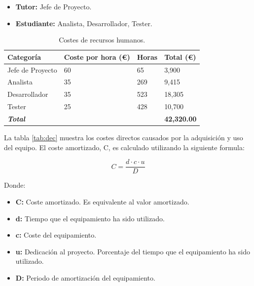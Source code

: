 \begin{itemize}

\item \textbf{Tutor:} Jefe de Proyecto.

\item \textbf{Estudiante:} Analista, Desarrollador, Tester.

\end{itemize} 

\begin{center}
\begin{table}[htbp]
\centering
\begin{tabular}{@{}p{3cm} R{3.5cm} R{2.2cm} R{2.4cm}@{}} 
\toprule
\textbf{Categoría} & \textbf{Coste por hora (\euro)} & \textbf{Horas} & \textbf{Total (\euro)} \\
\midrule
Jefe de Proyecto					& 60 						& 65			& 3,900 \\
Analista			 				& 35							& 269		& 9,415 \\
Desarrollador		 				& 35							& 523		& 18,305 \\
Tester		 					& 25							& 428		& 10,700 \\
\midrule
\textbf{\textit{Total}}			&							&			& \textbf{42,320.00}\\
\bottomrule
\end{tabular}
\caption{Costes de recursos humanos.}
\label{tab:dhrc}
\end{table}
\end{center}

La tabla \ref{tab:dec} muestra los costes directos causados por la adquisición y uso del equipo. El coste amortizado, C, es calculado utilizando la siguiente formula:

\begin{equation}
  C = \frac{d \cdot c \cdot u}{D}
\label{eq:costs}
\end{equation}

Donde:

\begin{itemize}

\item \textbf{C:} Coste amortizado. Es equivalente al valor amortizado.

\item \textbf{d:} Tiempo que el equipamiento ha sido utilizado.

\item \textbf{c:} Coste del equipamiento. 

\item \textbf{u:} Dedicación al proyecto. Porcentaje del tiempo que el equipamiento ha sido utilizado.

\item \textbf{D:} Periodo de amortización del equipamiento.

\end{itemize}

